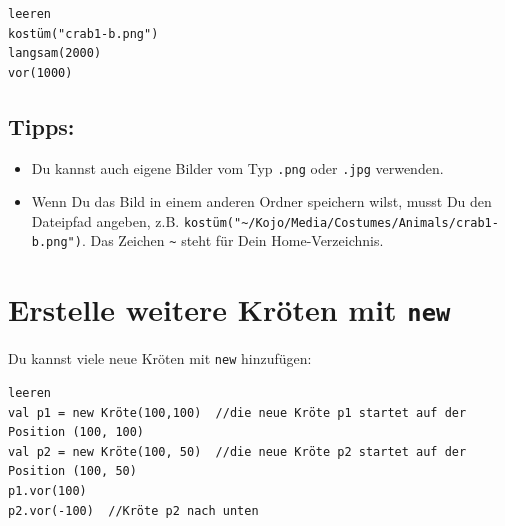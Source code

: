 \begin{lstlisting}[basicstyle={\ttfamily\fontsize{12}{15}\selectfont},numbers=none]
leeren
kostüm("crab1-b.png")  
langsam(2000)
vor(1000)
\end{lstlisting}
        
\section*{\color{OliveGreen}Tipps:}


\begin{itemize}

\item {Du kannst auch eigene Bilder vom Typ \lstinline{.png} oder \lstinline{.jpg} verwenden.}
\item {Wenn Du das Bild in einem anderen Ordner speichern wilst, musst Du den Dateipfad angeben, z.B. \lstinline{kostüm("~/Kojo/Media/Costumes/Animals/crab1-b.png")}. Das Zeichen \lstinline{~} steht für Dein Home-Verzeichnis.}

\end{itemize}


\chapter{Erstelle weitere Kröten mit \lstinline{new}}Du kannst viele neue Kröten mit \lstinline{new} hinzufügen:

\begin{lstlisting}[basicstyle={\ttfamily\fontsize{18}{22}\selectfont},numbers=none]
leeren
val p1 = new Kröte(100,100)  //die neue Kröte p1 startet auf der Position (100, 100)
val p2 = new Kröte(100, 50)  //die neue Kröte p2 startet auf der Position (100, 50)
p1.vor(100)
p2.vor(-100)  //Kröte p2 nach unten
\end{lstlisting}
        

  
